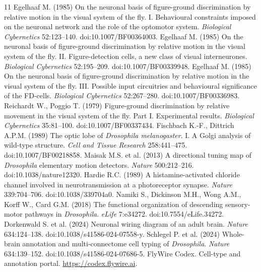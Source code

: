 \documentclass[11pt]{article}
\begin{document}
\begin{thebibliography}{11}
 Egelhaaf M. (1985) On the neuronal basis of figure-ground discrimination by relative motion in the visual system of the fly. I. Behavioural constraints imposed on the neuronal network and the role of the optomotor system. \textit{Biological Cybernetics} 52:123--140. doi:10.1007/BF00364003.
 Egelhaaf M. (1985) On the neuronal basis of figure-ground discrimination by relative motion in the visual system of the fly. II. Figure-detection cells, a new class of visual interneurones. \textit{Biological Cybernetics} 52:195--209. doi:10.1007/BF00339948.
 Egelhaaf M. (1985) On the neuronal basis of figure-ground discrimination by relative motion in the visual system of the fly. III. Possible input circuitries and behavioural significance of the FD-cells. \textit{Biological Cybernetics} 52:267--280. doi:10.1007/BF00336983.
 Reichardt W., Poggio T. (1979) Figure-ground discrimination by relative movement in the visual system of the fly. Part I. Experimental results. \textit{Biological Cybernetics} 35:81--100. doi:10.1007/BF00337434.
 Fischbach K.-F., Dittrich A.P.M. (1989) The optic lobe of \textit{Drosophila melanogaster}. I. A Golgi analysis of wild-type structure. \textit{Cell and Tissue Research} 258:441--475. doi:10.1007/BF00218858.
 Maisak M.S. et al. (2013) A directional tuning map of \textit{Drosophila} elementary motion detectors. \textit{Nature} 500:212--216. doi:10.1038/nature12320.
 Hardie R.C. (1989) A histamine-activated chloride channel involved in neurotransmission at a photoreceptor synapse. \textit{Nature} 339:704--706. doi:10.1038/339704a0.
 Namiki S., Dickinson M.H., Wong A.M., Korff W., Card G.M. (2018) The functional organization of descending sensory-motor pathways in \textit{Drosophila}. \textit{eLife} 7:e34272. doi:10.7554/eLife.34272.
 Dorkenwald S. et al. (2024) Neuronal wiring diagram of an adult brain. \textit{Nature} 634:124--138. doi:10.1038/s41586-024-07558-y.
 Schlegel P. et al. (2024) Whole-brain annotation and multi-connectome cell typing of \textit{Drosophila}. \textit{Nature} 634:139--152. doi:10.1038/s41586-024-07686-5.
 FlyWire Codex. Cell-type and annotation portal. \url{https://codex.flywire.ai}.
\end{thebibliography}
\end{document}
